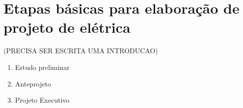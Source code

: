 \section{Etapas básicas para elaboração de projeto de elétrica} \label{section: referencias}

(PRECISA SER ESCRITA UMA INTRODUCAO)
\begin{enumerate}
	\item Estudo preliminar 
	\item Anteprojeto
	\item Projeto Executivo 
\end{enumerate}







\newpage